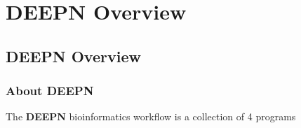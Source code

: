 \documentclass[11pt,fleqn]{book} %
\newcommand{\DEEPN}{\textbf{DEEPN }}
\begin{document}


\pagestyle{empty} %

\tableofcontents %

\cleardoublepage %

\pagestyle{fancy} %


\part{DEEPN Overview}



\chapter{DEEPN Overview}

\section{About DEEPN}
The \DEEPN bioinformatics workflow is a collection of 4 programs
\end{document}
